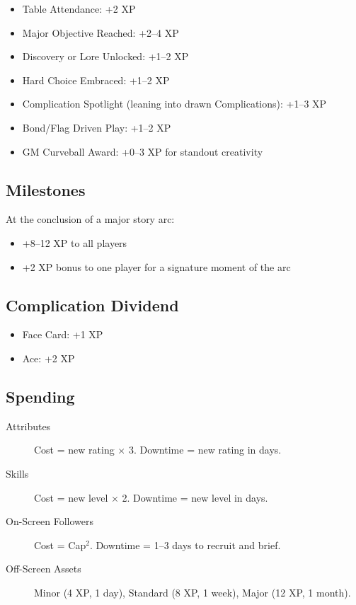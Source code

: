 \begin{itemize}
\item Table Attendance: +2 XP
\item Major Objective Reached: +2--4 XP
\item Discovery or Lore Unlocked: +1--2 XP
\item Hard Choice Embraced: +1--2 XP
\item Complication Spotlight (leaning into drawn Complications): +1--3 XP
\item Bond/Flag Driven Play: +1--2 XP
\item GM Curveball Award: +0--3 XP for standout creativity
\end{itemize}

\subsection{Milestones}

At the conclusion of a major story arc:
\begin{itemize}
\item +8--12 XP to all players
\item +2 XP bonus to one player for a signature moment of the arc
\end{itemize}

\subsection{Complication Dividend}
\begin{itemize}
    \item Face Card: +1 XP
    \item Ace: +2 XP
\end{itemize}

\subsection{Spending}

\begin{description}
\item[Attributes] Cost = new rating $\times$ 3. Downtime = new rating in days.
\item[Skills] Cost = new level $\times$ 2. Downtime = new level in days.
\item[On-Screen Followers] Cost = Cap$^2$. Downtime = 1--3 days to recruit and brief.
\item[Off-Screen Assets] Minor (4 XP, 1 day), Standard (8 XP, 1 week), Major (12 XP, 1 month).
\end{description}

